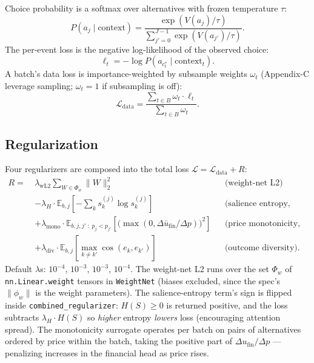 \documentclass[11pt,a4paper]{article}
\begin{document}
Choice probability is a softmax over alternatives with frozen
temperature $\tau$:
\begin{equation}
  P(a_j \mid \text{context}) = \frac{\exp(V(a_j) / \tau)}{\sum_{j'=0}^{J-1} \exp(V(a_{j'}) / \tau)}.
  \label{eq:softmax}
\end{equation}
The per-event loss is the negative log-likelihood of the observed
choice:
\begin{equation}
  \ell_t = -\log P(a_{c^*_t} \mid \text{context}_t).
  \label{eq:nll}
\end{equation}
A batch's data loss is importance-weighted by subsample weights
$\omega_t$ (Appendix-C leverage sampling; $\omega_t = 1$ if
subsampling is off):
\begin{equation}
  \mathcal{L}_{\text{data}}
    = \frac{\sum_{t \in B} \omega_t \cdot \ell_t}{\sum_{t \in B} \omega_t}.
  \label{eq:weighted-loss}
\end{equation}

\subsection{Regularization}

Four regularizers are composed into the total loss
$\mathcal{L} = \mathcal{L}_{\text{data}} + R$:
\begin{equation}
\begin{aligned}
  R = \ & \lambda_{\mathrm{wL2}} \sum_{W \in \Phi_w} \|W\|_2^2
      && \text{(weight-net L2)} \\
      & - \lambda_H \cdot \mathbb{E}_{b,j}\!\left[
          -\sum_k s_k^{(j)} \log s_k^{(j)}
        \right]
      && \text{(salience entropy, sign flipped)} \\
      & + \lambda_{\mathrm{mono}} \cdot \mathbb{E}_{b,j,j'\;:\;p_j < p_{j'}}
          \left[\bigl(\max(0, \Delta \bar{u}_{\text{fin}} / \Delta p)\bigr)^2\right]
      && \text{(price monotonicity, alt-level)} \\
      & + \lambda_{\mathrm{div}} \cdot \mathbb{E}_{b,j}\!\left[
          \max_{k \ne k'} \cos(e_k, e_{k'})
        \right]
      && \text{(outcome diversity)}.
\end{aligned}
\label{eq:regs}
\end{equation}
Default $\lambda$s: $10^{-4}$, $10^{-3}$, $10^{-3}$, $10^{-4}$. The
weight-net L2 runs over the set $\Phi_w$ of
\texttt{nn.Linear.weight} tensors in \texttt{WeightNet} (biases
excluded, since the spec's $\|\phi_w\|$ is the weight parameters).
The salience-entropy term's sign is flipped inside
\texttt{combined\_regularizer}: $H(S) \ge 0$ is returned positive, and
the loss subtracts $\lambda_H \cdot H(S)$ so \emph{higher} entropy
\emph{lowers} loss (encouraging attention spread). The monotonicity
surrogate operates per batch on pairs of alternatives ordered by price
within the batch, taking the positive part of $\Delta u_{\text{fin}} /
\Delta p$ — penalizing increases in the financial head as price
rises.
\end{document}
